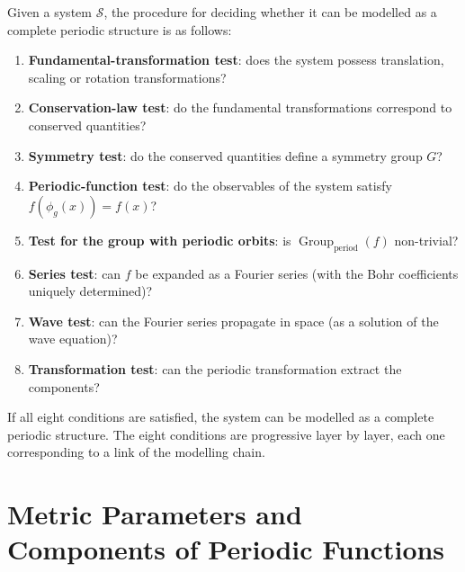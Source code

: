 \begin{remark}\label{rem:periodic_structure_criterion}
Given a system $\mathcal{S}$, the procedure for deciding whether it can be modelled as a complete periodic structure is as follows:
\begin{enumerate}[label=(\roman*)]
    \item \textbf{Fundamental-transformation test}: does the system possess translation, scaling or rotation transformations?
    \item \textbf{Conservation-law test}: do the fundamental transformations correspond to conserved quantities?
    \item \textbf{Symmetry test}: do the conserved quantities define a symmetry group $G$?
    \item \textbf{Periodic-function test}: do the observables of the system satisfy $f(\phi_g(x)) = f(x)$?
    \item \textbf{Test for the group with periodic orbits}: is $\operatorname{Group}_{\mathrm{period}}(f)$ non-trivial?
    \item \textbf{Series test}: can $f$ be expanded as a Fourier series (with the Bohr coefficients uniquely determined)?
    \item \textbf{Wave test}: can the Fourier series propagate in space (as a solution of the wave equation)?
    \item \textbf{Transformation test}: can the periodic transformation extract the components?
\end{enumerate}
If all eight conditions are satisfied, the system can be modelled as a complete periodic structure. The eight conditions are progressive layer by layer, each one corresponding to a link of the modelling chain.
\end{remark}

\section{Metric Parameters and Components of Periodic Functions}

